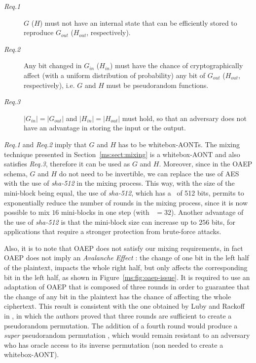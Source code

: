 {\begin{description}
	\item [{\em Req.1}] \hspace{1ex} $G$ ($H$) must not have an internal state that can be efficiently stored to reproduce $G_{out}$ ($H_{out}$, respectively).
	\item [{\em Req.2}] \hspace{1ex} Any bit changed in $G_{in}$ ($H_{in}$) must have the chance of cryptographically affect (with a uniform distribution of probability) any bit of $G_{out}$ ($H_{out}$, respectively), i.e. $G$ and $H$ must be pseudorandom functions.
	\item [{\em Req.3}] \hspace{1ex} $|G_{in}| = |G_{out}|$ and $|H_{in}| = |H_{out}|$ must hold, so that an adversary does not have an advantage in storing the input or the output.
\end{description}
\vspace{1ex}

{\em Req.1} and {\em Req.2} imply that $G$ and $H$ has to be whitebox-AONTs. The mixing technique presented in Section~\ref{ms:sect:mixing} is a whitebox-AONT and also satisfies {\em Req.3}, therefore it can be used as $G$ and $H$.
Moreover, since in the OAEP schema, $G$ and $H$ do not need to be invertible, we can replace the use of AES with the use of {\em sha-512} in the mixing process. This way, with the size of the mini-block being equal, the use of {\em sha-512}, which has a \bsize\ of 512 bits, permits to exponentially reduce the number of rounds in the mixing process, since it is now possible to mix $16$ mini-blocks in one step (with \msize\ $= 32$).
Another advantage of the use of {\em sha-512} is that the mini-block size can increase up to $256$ bits, for applications that require a stronger protection from brute-force attacks.

Also, it is to note that OAEP does not satisfy our mixing requirements, in fact OAEP does not imply an {\em Avalanche Effect} \cite{webster1985design}: the change of one bit in the left half of the plaintext, impacts the whole right half, but only affects the corresponding bit in the left half, as shown in Figure~\ref{ms:fig:oaep-issue}. It is required to use an adaptation of OAEP that is composed of three rounds in order to guarantee that the change of any bit in the plaintext has the chance of affecting the whole ciphertext. This result is consistent with the one obtained by Luby and Rackoff in \cite{lr88}, in which the authors proved that three rounds are sufficient to create a pseudorandom permutation. The addition of a fourth round would produce a {\em super} pseudorandom permutation \cite{lr88}, which would remain resistant to an adversary who has oracle access to its inverse permutation (non needed to create a whitebox-AONT).

}
